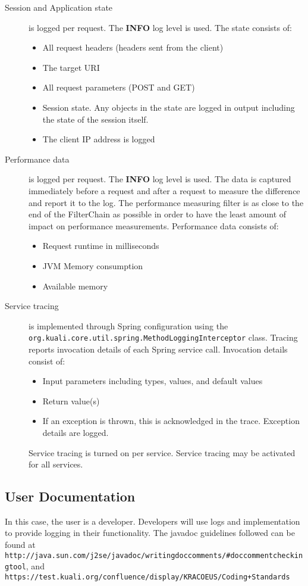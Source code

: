 \documentclass[12pt]{report}
\begin{document}
\begin{description}
\item [Session and Application state] is logged per request. The \textbf{INFO} log level is used. The state consists of:
\begin{itemize}
  \item All request headers (headers sent from the client)
  \item The target URI
  \item All request parameters (POST and GET)
  \item Session state. Any objects in the state are logged in output including the state of the session itself.
  \item The client IP address is logged
\end{itemize}

\item [Performance data] is logged per request. The \textbf{INFO} log level is used. The data is captured immediately before a request and after a request to measure the difference
and report it to the log. The performance measuring filter is as close to the end of the FilterChain as possible in order to have
the least amount of impact on performance measurements. Performance data consists of:
\begin{itemize}
  \item Request runtime in milliseconds
  \item JVM Memory consumption
  \item Available memory
\end{itemize}

\item [Service tracing] is implemented through Spring configuration using the \verb|org.kuali.core.util.spring.MethodLoggingInterceptor|
class. Tracing reports invocation details of each Spring service call. Invocation details consist of:
\begin{itemize}
  \item Input parameters including types, values, and default values
  \item Return value(s)
  \item If an exception is thrown, this is acknowledged in the trace. Exception details are logged.
\end{itemize}

Service tracing is turned on per service. Service tracing may be activated for all services.
\end{description}

\subsection{User Documentation}
In this case, the user is a developer. Developers will use logs and implementation to provide logging in their functionality.
The javadoc guidelines followed can be found at \verb|http://java.sun.com/j2se/javadoc/writingdoccomments/#doccommentcheckingtool|, 
and \verb|https://test.kuali.org/confluence/display/KRACOEUS/Coding+Standards|
\end{document}
